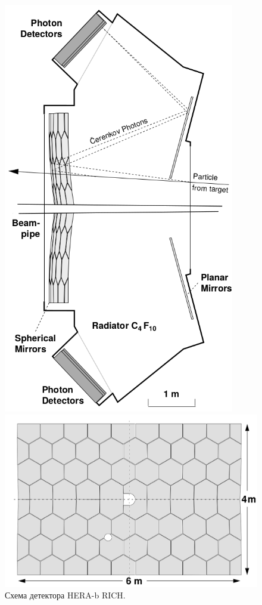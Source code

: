
\begin{figure}[H]
\begin{minipage}[b]{0.45\textwidth}
\includegraphics[width=0.9\textwidth]{pictures/HERAb_RICH.png}
\caption{Схема детектора HERA-b RICH.}
\label{fig:HERAbRICH}
\end{minipage}
\hspace{0.01\textwidth}
\begin{minipage}[b]{0.545\textwidth}
\includegraphics[width=1.0\textwidth]{pictures/HERAb_RICH_mirrors.png}

\end{minipage}
\end{figure}
